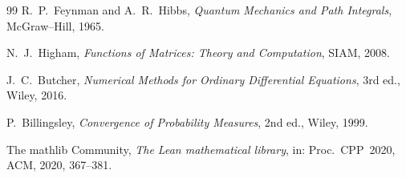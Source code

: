 \documentclass[11pt,a4paper]{article}
\theoremstyle{plain}
\theoremstyle{definition}
\theoremstyle{remark}
\begin{document}
\begin{thebibliography}{99}
R.~P.~Feynman and A.~R.~Hibbs, \emph{Quantum Mechanics and Path Integrals},
McGraw--Hill, 1965.

N.~J.~Higham, \emph{Functions of Matrices: Theory and Computation}, SIAM, 2008.

J.~C.~Butcher, \emph{Numerical Methods for Ordinary Differential Equations}, 3rd ed.,
Wiley, 2016.

P.~Billingsley, \emph{Convergence of Probability Measures}, 2nd ed., Wiley, 1999.

The mathlib Community, \emph{The Lean mathematical library}, in: Proc.\ CPP~2020,
ACM, 2020, 367--381.

\end{thebibliography}
\end{document}
